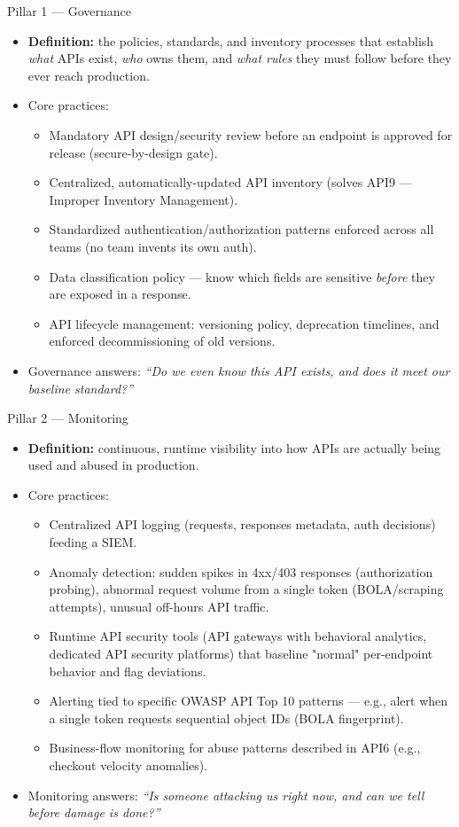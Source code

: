 \documentclass[11pt]{article}
\begin{document}
\begin{pillarbox}{Pillar 1 --- Governance}
\begin{itemize}
  \item \textbf{Definition:} the policies, standards, and inventory processes that establish \textit{what} APIs exist, \textit{who} owns them, and \textit{what rules} they must follow before they ever reach production.
  \item Core practices:
  \begin{itemize}
    \item Mandatory API design/security review before an endpoint is approved for release (secure-by-design gate).
    \item Centralized, automatically-updated API inventory (solves API9 --- Improper Inventory Management).
    \item Standardized authentication/authorization patterns enforced across all teams (no team invents its own auth).
    \item Data classification policy --- know which fields are sensitive \textit{before} they are exposed in a response.
    \item API lifecycle management: versioning policy, deprecation timelines, and enforced decommissioning of old versions.
  \end{itemize}
  \item Governance answers: \textit{``Do we even know this API exists, and does it meet our baseline standard?''}
\end{itemize}
\end{pillarbox}

\begin{pillarbox}{Pillar 2 --- Monitoring}
\begin{itemize}
  \item \textbf{Definition:} continuous, runtime visibility into how APIs are actually being used and abused in production.
  \item Core practices:
  \begin{itemize}
    \item Centralized API logging (requests, responses metadata, auth decisions) feeding a SIEM.
    \item Anomaly detection: sudden spikes in 4xx/403 responses (authorization probing), abnormal request volume from a single token (BOLA/scraping attempts), unusual off-hours API traffic.
    \item Runtime API security tools (API gateways with behavioral analytics, dedicated API security platforms) that baseline "normal" per-endpoint behavior and flag deviations.
    \item Alerting tied to specific OWASP API Top 10 patterns --- e.g., alert when a single token requests sequential object IDs (BOLA fingerprint).
    \item Business-flow monitoring for abuse patterns described in API6 (e.g., checkout velocity anomalies).
  \end{itemize}
  \item Monitoring answers: \textit{``Is someone attacking us right now, and can we tell before damage is done?''}
\end{itemize}
\end{pillarbox}
\end{document}
